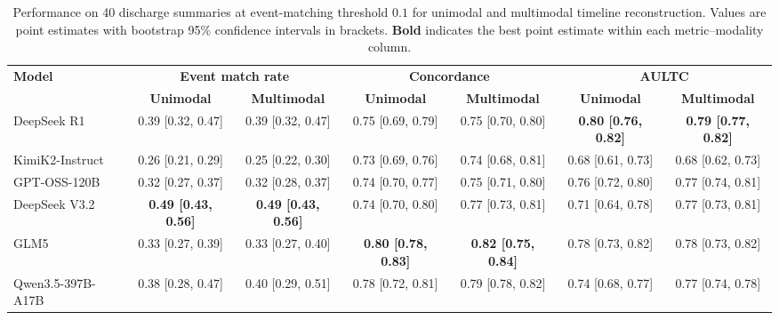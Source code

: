 \begin{table}[htbp]
\caption{Performance on 40 discharge summaries at event-matching threshold $0.1$ for unimodal and multimodal timeline reconstruction. Values are point estimates with bootstrap 95\% confidence intervals in brackets. \textbf{Bold} indicates the best point estimate within each metric--modality column.}
\ChEightTableBodyStart
\begin{ChEightFloatBody}

{\footnotesize
\setlength{\tabcolsep}{3pt}
\renewcommand{\arraystretch}{1.12}

\begin{adjustbox}{max width=\textwidth}
\begin{tabular}{lcccccc}
\hline
\multirow{2}{*}{\textbf{Model}} 
& \multicolumn{2}{c}{\textbf{Event match rate}} 
& \multicolumn{2}{c}{\textbf{Concordance}} 
& \multicolumn{2}{c}{\textbf{AULTC}} \\
\cline{2-7}
& \textbf{Unimodal} & \textbf{Multimodal} 
& \textbf{Unimodal} & \textbf{Multimodal} 
& \textbf{Unimodal} & \textbf{Multimodal} \\
\hline
DeepSeek R1
& 0.39 [0.32, 0.47]
& 0.39 [0.32, 0.47]
& 0.75 [0.69, 0.79]
& 0.75 [0.70, 0.80]
& \textbf{0.80 [0.76, 0.82]} 
& \textbf{0.79 [0.77, 0.82]}\\

KimiK2-Instruct
& 0.26 [0.21, 0.29]
& 0.25 [0.22, 0.30]
& 0.73 [0.69, 0.76]
& 0.74 [0.68, 0.81]
& 0.68 [0.61, 0.73]
& 0.68 [0.62, 0.73] \\

GPT-OSS-120B
& 0.32 [0.27, 0.37]
& 0.32 [0.28, 0.37]
& 0.74 [0.70, 0.77]
& 0.75 [0.71, 0.80]
& 0.76 [0.72, 0.80] 
& 0.77 [0.74, 0.81]\\

DeepSeek V3.2
& \textbf{0.49 [0.43, 0.56]}
& \textbf{0.49 [0.43, 0.56]}
& 0.74 [0.70, 0.80]
& 0.77 [0.73, 0.81]
& 0.71 [0.64, 0.78] 
& 0.77 [0.73, 0.81]\\

GLM5
& 0.33 [0.27, 0.39]
& 0.33 [0.27, 0.40]
& \textbf{0.80 [0.78, 0.83]}
& \textbf{0.82 [0.75, 0.84]}
& 0.78 [0.73, 0.82] 
& 0.78 [0.73, 0.82]\\

Qwen3.5-397B-A17B
& 0.38 [0.28, 0.47]
& 0.40 [0.29, 0.51]
& 0.78 [0.72, 0.81]
& 0.79 [0.78, 0.82]
& 0.74 [0.68, 0.77] 
& 0.77 [0.74, 0.78]\\

\hline
\end{tabular}
\end{adjustbox}


}


\end{ChEightFloatBody}
\end{table}